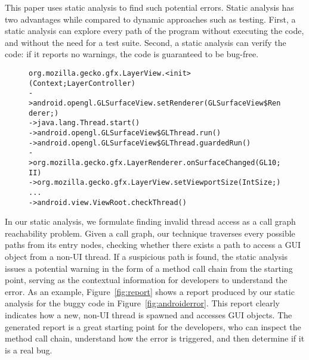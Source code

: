 This paper uses static analysis to find such potential errors.
Static analysis has two advantages while compared to dynamic approaches such as
 testing. First, a static analysis can explore every path of the program without
executing the code, and without the need for a test suite.
Second, a static analysis can verify the code: if it
reports no warnings, the code is guaranteed to be bug-free. 


\begin{figure}[t]
\begin{CodeOut}
\begin{alltt}

   org.mozilla.gecko.gfx.LayerView.<init>(Context;LayerController)
-> android.opengl.GLSurfaceView.setRenderer(GLSurfaceView\$Renderer;)
-> java.lang.Thread.start()
-> android.opengl.GLSurfaceView\$GLThread.run()
-> android.opengl.GLSurfaceView\$GLThread.guardedRun()
-> org.mozilla.gecko.gfx.LayerRenderer.onSurfaceChanged(GL10;II)
-> org.mozilla.gecko.gfx.LayerView.setViewportSize(IntSize;)
...
-> android.view.ViewRoot.checkThread()
\end{alltt}
\end{CodeOut}
\vspace*{-2.0ex}  %
\end{figure}

In our static analysis, we formulate finding invalid thread access as a call graph reachability
problem. Given a call graph, our technique traverses
every possible paths from its entry nodes, checking whether
there exists a path to access a GUI object from a non-UI thread. If 
a suspicious path is found,
the static analysis issues a potential warning in the form of a method
call chain from the starting point, serving as the contextual information
for developers to understand the error.
As an example, Figure~\ref{fig:report} shows a report produced
by our static analysis for the buggy code in Figure~\ref{fig:androiderror}.
This report clearly indicates how a new, non-UI thread is spawned and
accesses GUI objects. 
The generated report is a great starting point for the developers, who can
inspect the method call chain, understand how the error
is triggered, and then determine if it is a real bug.

